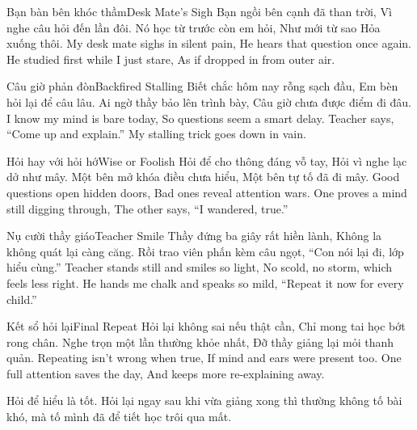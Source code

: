\begin{tutuyetbox}{Bạn bàn bên khóc thầm}{Desk Mate's Sigh}
Bạn ngồi bên cạnh đã than trời,
Vì nghe câu hỏi đến lần đôi.
Nó học từ trước còn em hỏi,
Như mới từ sao Hỏa xuống thôi.
\tcblower
My desk mate sighs in silent pain,
He hears that question once again.
He studied first while I just stare,
As if dropped in from outer air.
\end{tutuyetbox}

\begin{tutuyetbox}{Câu giờ phản đòn}{Backfired Stalling}
Biết chắc hôm nay rỗng sạch đầu,
Em bèn hỏi lại để câu lâu.
Ai ngờ thầy bảo lên trình bày,
Câu giờ chưa được điểm đi đâu.
\tcblower
I know my mind is bare today,
So questions seem a smart delay.
Teacher says, “Come up and explain.”
My stalling trick goes down in vain.
\end{tutuyetbox}

\begin{tutuyetbox}{Hỏi hay với hỏi hớ}{Wise or Foolish}
Hỏi để cho thông đáng vỗ tay,
Hỏi vì nghe lạc dở như mây.
Một bên mở khóa điều chưa hiểu,
Một bên tự tố đã đi mây.
\tcblower
Good questions open hidden doors,
Bad ones reveal attention wars.
One proves a mind still digging through,
The other says, “I wandered, true.”
\end{tutuyetbox}

\begin{tutuyetbox}{Nụ cười thầy giáo}{Teacher Smile}
Thầy đứng ba giây rất hiền lành,
Không la không quát lại càng căng.
Rồi trao viên phấn kèm câu ngọt,
“Con nói lại đi, lớp hiểu cùng.”
\tcblower
Teacher stands still and smiles so light,
No scold, no storm, which feels less right.
He hands me chalk and speaks so mild,
“Repeat it now for every child.”
\end{tutuyetbox}

\begin{tutuyetbox}{Kết sổ hỏi lại}{Final Repeat}
Hỏi lại không sai nếu thật cần,
Chỉ mong tai học bớt rong chân.
Nghe trọn một lần thường khỏe nhất,
Đỡ thầy giảng lại mỏi thanh quản.
\tcblower
Repeating isn't wrong when true,
If mind and ears were present too.
One full attention saves the day,
And keeps more re-explaining away.
\end{tutuyetbox}

\begin{ghichu}
Hỏi để hiểu là tốt. Hỏi lại ngay sau khi vừa giảng xong thì thường không tố bài khó, mà tố mình đã để tiết học trôi qua mất.
\end{ghichu}